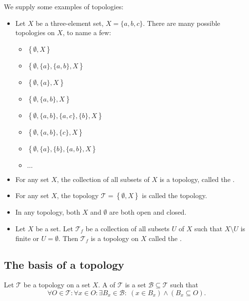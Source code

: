 \begin{example}
We supply some examples of topologies:
\begin{itemize}
\item Let $X$ be a three-element set, $X = \{a,b,c\}$. There are many possible topologies on $X$, to name a few:
\begin{itemize}
\item $\left\{\emptyset, X\right\}$
\item $\left\{\emptyset, \{a\}, \{a,b\}, X\right\}$
\item $\left\{\emptyset, \{a\}, X\right\}$
\item $\left\{\emptyset, \{a,b\}, X\right\}$
\item $\left\{\emptyset, \{a,b\}, \{a,c\}, \{b\}, X\right\}$
\item $\left\{\emptyset, \{a,b\}, \{c\}, X\right\}$
\item $\left\{\emptyset, \{a\}, \{b\}, \{a,b\}, X\right\}$
\item $\ldots$
\end{itemize}
\item For any set $X$, the collection of all subsets of $X$ is a topology, called the .
\item For any set $X$, the topology $\mathcal{T} = \left\{\emptyset, X\right\}$ is called the  topology.
\item In any topology, both $X$ and $\emptyset$ are both open and closed.
\item Let $X$ be a set. Let $\mathcal{T}_f$ be a collection of all subsets $U$ of $X$ such that $X\setminus U$ is finite or $U=\emptyset$. Then $\mathcal{T}_f$ is a topology on $X$ called the .
\end{itemize}
\end{example}

\subsection{The basis of a topology}
\begin{definition}
Let $\mathcal{T}$ be a topology on a set $X$. A  of $\mathcal{T}$ is a set $\mathcal{B} \subseteq \mathcal{T}$ such that
\[ \forall O\in \mathcal{T}:\forall x\in O: \exists B_x\in \mathcal{B}: \; (x\in B_x)\land (B_x\subseteq O).  \]
\end{definition}

